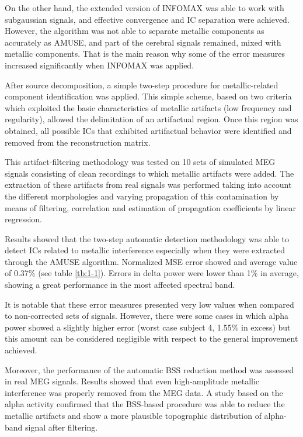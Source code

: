 On the other hand, the extended version of INFOMAX was able to work with subgaussian signals, and effective convergence and IC separation were achieved. However, the algorithm was not able to separate metallic components as accurately as AMUSE, and part of the cerebral signals remained, mixed with metallic components. That is the main reason why some of the error measures increased significantly when INFOMAX was applied.

After source decomposition, a simple two-step procedure for metallic-related component identification was applied. This simple scheme, based on two criteria which exploited the basic characteristics of metallic artifacts (low frequency and regularity), allowed the delimitation of an artifactual region. Once this region was obtained, all possible ICs that exhibited artifactual behavior were identified and removed from the reconstruction matrix.

This artifact-filtering methodology was tested on 10 sets of simulated MEG signals consisting of clean recordings to which metallic artifacts were added. The extraction of these artifacts from real signals was performed taking into account the different morphologies and varying propagation of this contamination by means of filtering, correlation and estimation of propagation coefficients by linear regression.

Results showed that the two-step automatic detection methodology was able to detect ICs related to metallic interference especially when they were extracted through the AMUSE algorithm. Normalized MSE error showed and average value of 0.37\% (see table \ref{tb:1-1}). Errors in delta power were lower than 1\% in average, showing a great performance in the most affected spectral band.

It is notable that these error measures presented very low values when compared to non-corrected sets of signals. However, there were some cases in which alpha power showed a slightly higher error (worst case subject 4, 1.55\% in excess) but this amount can be considered negligible with respect to the general improvement achieved.

Moreover, the performance of the automatic BSS reduction method was assessed in real MEG signals. Results showed that even high-amplitude metallic interference was properly removed from the MEG data. A study based on the alpha activity confirmed that the BSS-based procedure was able to reduce the metallic artifacts and show a more plausible topographic distribution of alpha-band signal after filtering.

